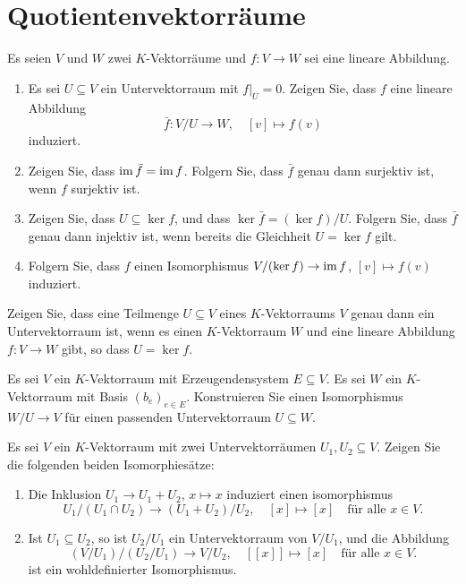 \section{Quotientenvektorräume}


\begin{question}
  Es seien $V$ und $W$ zwei $K$-Vektorräume und $f \colon V \to W$ sei eine lineare Abbildung.
  \begin{enumerate}[leftmargin=*]
    \item
      Es sei $U \subseteq V$ ein Untervektorraum mit $f|_U = 0$.
      Zeigen Sie, dass $f$ eine lineare Abbildung
      \[
        \bar{f} \colon V\!/U \to W,
        \quad
        [v] \mapsto f(v)
      \]
      induziert.
    \item
      Zeigen Sie, dass $\operatorname{im} \bar{f} = \operatorname{im} f$.
      Folgern Sie, dass $\bar{f}$ genau dann surjektiv ist, wenn $f$ surjektiv ist.
    \item
      Zeigen Sie, dass $U \subseteq \ker f$, und dass $\ker \bar{f} = (\ker f)/U$.
      Folgern Sie, dass $\bar{f}$ genau dann injektiv ist, wenn bereits die Gleichheit $U = \ker f$ gilt.
    \item
      Folgern Sie, dass $f$ einen Isomorphismus $V/(\ker f) \to \operatorname{im} f$, $[v] \mapsto f(v)$ induziert.
  \end{enumerate}
\end{question}


\begin{question}
  Zeigen Sie, dass eine Teilmenge $U \subseteq V$ eines $K$-Vektorraums $V$ genau dann ein Untervektorraum ist, wenn es einen $K$-Vektorraum $W$ und eine lineare Abbildung $f \colon V \to W$ gibt, so dass $U = \ker f$.
\end{question}


\begin{question}
  Es sei $V$ ein $K$-Vektorraum mit Erzeugendensystem $E \subseteq V$.
  Es sei $W$ ein $K$-Vektorraum mit Basis $(b_e)_{e \in E}$.
  Konstruieren Sie einen Isomorphismus $W\!/U \to V$ für einen passenden Untervektorraum $U \subseteq W$.
\end{question}


\begin{question}
  Es sei $V$ ein $K$-Vektorraum mit zwei Untervektorräumen $U_1, U_2 \subseteq V$.
  Zeigen Sie die folgenden beiden Isomorphiesätze:
  \begin{enumerate}[leftmargin=*]
    \item
      Die Inklusion $U_1 \to U_1 + U_2$, $x \mapsto x$ induziert einen isomorphismus
      \[
        U_1 / (U_1 \cap U_2) \to (U_1 + U_2) / U_2,
        \quad
        [x] \mapsto [x]
        \quad
        \text{für alle $x \in V$}.
      \]
    \item
      Ist $U_1 \subseteq U_2$, so ist $U_2 / U_1$ ein Untervektorraum von $V / U_1$, und die Abbildung
      \[
        (V \! / U_1) / (U_2 / U_1) \to V \! / U_2,
        \quad
        [[x]] \mapsto [x]
        \quad
        \text{für alle $x \in V$}.
      \]
      ist ein wohldefinierter Isomorphismus.
  \end{enumerate}
\end{question}


